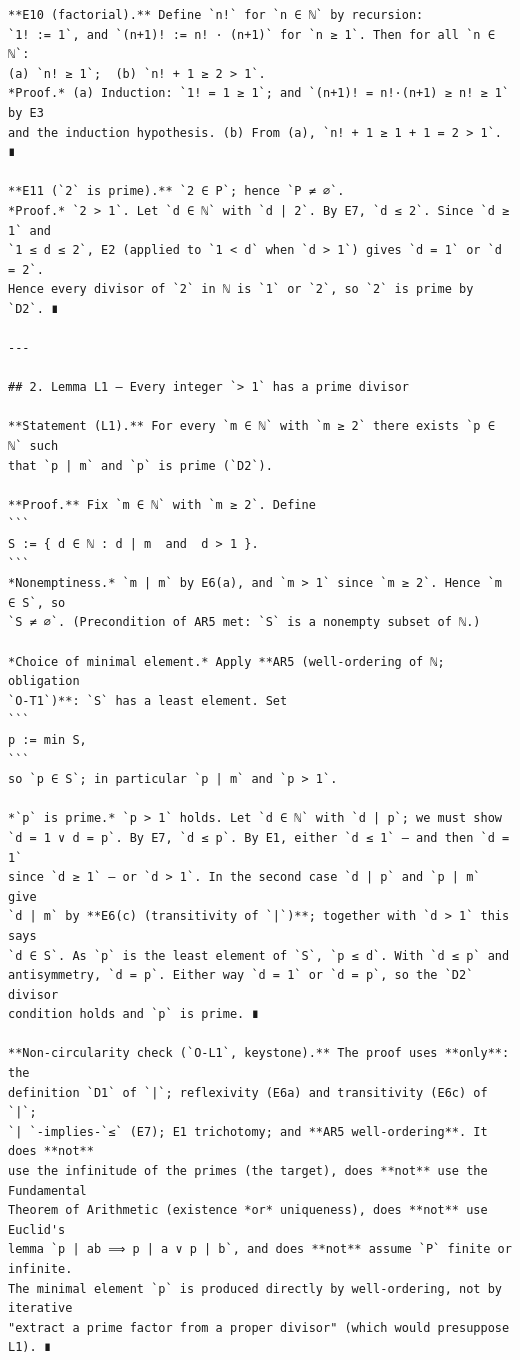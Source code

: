 \documentclass[11pt]{article}
\begin{document}
\begin{verbatim}
**E10 (factorial).** Define `n!` for `n ∈ ℕ` by recursion:
`1! := 1`, and `(n+1)! := n! · (n+1)` for `n ≥ 1`. Then for all `n ∈ ℕ`:
(a) `n! ≥ 1`;  (b) `n! + 1 ≥ 2 > 1`.
*Proof.* (a) Induction: `1! = 1 ≥ 1`; and `(n+1)! = n!·(n+1) ≥ n! ≥ 1` by E3
and the induction hypothesis. (b) From (a), `n! + 1 ≥ 1 + 1 = 2 > 1`. ∎

**E11 (`2` is prime).** `2 ∈ P`; hence `P ≠ ∅`.
*Proof.* `2 > 1`. Let `d ∈ ℕ` with `d | 2`. By E7, `d ≤ 2`. Since `d ≥ 1` and
`1 ≤ d ≤ 2`, E2 (applied to `1 < d` when `d > 1`) gives `d = 1` or `d = 2`.
Hence every divisor of `2` in ℕ is `1` or `2`, so `2` is prime by `D2`. ∎

---

## 2. Lemma L1 — Every integer `> 1` has a prime divisor

**Statement (L1).** For every `m ∈ ℕ` with `m ≥ 2` there exists `p ∈ ℕ` such
that `p | m` and `p` is prime (`D2`).

**Proof.** Fix `m ∈ ℕ` with `m ≥ 2`. Define
```
S := { d ∈ ℕ : d | m  and  d > 1 }.
```
*Nonemptiness.* `m | m` by E6(a), and `m > 1` since `m ≥ 2`. Hence `m ∈ S`, so
`S ≠ ∅`. (Precondition of AR5 met: `S` is a nonempty subset of ℕ.)

*Choice of minimal element.* Apply **AR5 (well-ordering of ℕ; obligation
`O-T1`)**: `S` has a least element. Set
```
p := min S,
```
so `p ∈ S`; in particular `p | m` and `p > 1`.

*`p` is prime.* `p > 1` holds. Let `d ∈ ℕ` with `d | p`; we must show
`d = 1 ∨ d = p`. By E7, `d ≤ p`. By E1, either `d ≤ 1` — and then `d = 1`
since `d ≥ 1` — or `d > 1`. In the second case `d | p` and `p | m` give
`d | m` by **E6(c) (transitivity of `|`)**; together with `d > 1` this says
`d ∈ S`. As `p` is the least element of `S`, `p ≤ d`. With `d ≤ p` and
antisymmetry, `d = p`. Either way `d = 1` or `d = p`, so the `D2` divisor
condition holds and `p` is prime. ∎

**Non-circularity check (`O-L1`, keystone).** The proof uses **only**: the
definition `D1` of `|`; reflexivity (E6a) and transitivity (E6c) of `|`;
`| `-implies-`≤` (E7); E1 trichotomy; and **AR5 well-ordering**. It does **not**
use the infinitude of the primes (the target), does **not** use the Fundamental
Theorem of Arithmetic (existence *or* uniqueness), does **not** use Euclid's
lemma `p | ab ⟹ p | a ∨ p | b`, and does **not** assume `P` finite or infinite.
The minimal element `p` is produced directly by well-ordering, not by iterative
"extract a prime factor from a proper divisor" (which would presuppose L1). ∎


\end{verbatim}
\end{document}
